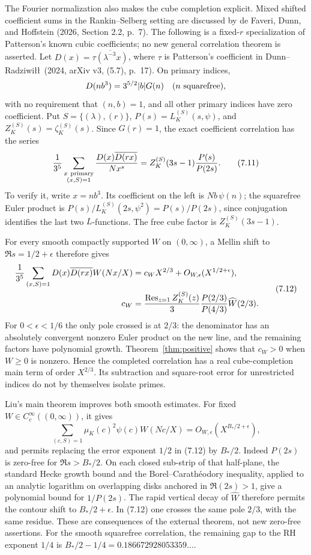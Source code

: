 \documentclass[11pt]{article}
\begin{document}
The Fourier normalization also makes the cube completion explicit. Mixed shifted coefficient sums in the Rankin--Selberg setting are discussed by de Faveri, Dunn, and Hoffstein (2026, Section 2.2, p.~7). The following is a fixed-$r$ specialization of Patterson's known cubic coefficients; no new general correlation theorem is asserted. Let $D(x)=\overline{\tau(\lambda^{-3}x)}$, where $\tau$ is Patterson's coefficient in Dunn--Radziwi\l\l\ (2024, arXiv v3, (5.7), p.~17). On primary indices,
\[
 D(nb^3)=3^{5/2}|b|G(n)\quad(n\ {\rm squarefree}),
\]
with no requirement that $(n,b)=1$, and all other primary indices have zero coefficient. Put $S=\{(\lambda),(r)\}$, $P(s)=L_K^{(S)}(s,\psi)$, and $Z_K^{(S)}(s)=\zeta_K^{(S)}(s)$. Since $G(r)=1$, the exact coefficient correlation has the series
\[
 \frac1{3^5}\sum_{\substack{x\ {\rm primary}\\(x,S)=1}}
       \frac{D(x)\overline{D(rx)}}{Nx^s}
   =Z_K^{(S)}(3s-1)\frac{P(s)}{P(2s)}.
 \tag{7.11}
\]
To verify it, write $x=nb^3$. Its coefficient on the left is $Nb\,\psi(n)$; the squarefree Euler product is $P(s)/L_K^{(S)}(2s,\psi^2)=P(s)/P(2s)$, since conjugation identifies the last two $L$-functions. The free cube factor is $Z_K^{(S)}(3s-1)$.

For every smooth compactly supported $W$ on $(0,\infty)$, a Mellin shift to $\Re s=1/2+\epsilon$ therefore gives
\[
 \begin{aligned}
 \frac1{3^5}\sum_{(x,S)=1}D(x)\overline{D(rx)}W(Nx/X)
    &=c_W X^{2/3}+O_{W,\epsilon}(X^{1/2+\epsilon}),\\
 c_W&=\frac{\mathop{\rm Res}_{z=1}Z_K^{(S)}(z)}3
       \frac{P(2/3)}{P(4/3)}\widehat W(2/3).
 \end{aligned}
 \tag{7.12}
\]
For $0<\epsilon<1/6$ the only pole crossed is at $2/3$: the denominator has an absolutely convergent nonzero Euler product on the new line, and the remaining factors have polynomial growth. Theorem~\ref{thm:positive} shows that $c_W>0$ when $W\ge0$ is nonzero. Hence the completed correlation has a real cube-completion main term of order $X^{2/3}$. Its subtraction and square-root error for unrestricted indices do not by themselves isolate primes.

Liu's main theorem improves both smooth estimates. For fixed $W\in C_c^\infty((0,\infty))$, it gives
\[
 \sum_{(c,S)=1}\mu_K(c)^2\psi(c)W(Nc/X)
       =O_{W,\epsilon}(X^{B_*/2+\epsilon}),
 \tag{7.12a}
\]
and permits replacing the error exponent $1/2$ in (7.12) by $B_*/2$. Indeed $P(2s)$ is zero-free for $\Re s>B_*/2$. On each closed sub-strip of that half-plane, the standard Hecke growth bound and the Borel--Carath\'eodory inequality, applied to an analytic logarithm on overlapping disks anchored in $\Re(2s)>1$, give a polynomial bound for $1/P(2s)$. The rapid vertical decay of $\widehat W$ therefore permits the contour shift to $B_*/2+\epsilon$. In (7.12) one crosses the same pole $2/3$, with the same residue. These are consequences of the external theorem, not new zero-free assertions. For the smooth squarefree correlation, the remaining gap to the RH exponent $1/4$ is $B_*/2-1/4=0.186672928053359\ldots$.
\end{document}
